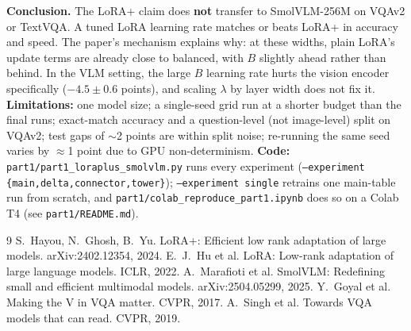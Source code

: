 \documentclass[10pt,a4paper]{article}
\begin{document}
\textbf{Conclusion.} The LoRA+ claim does \textbf{not} transfer to SmolVLM-256M on VQAv2 or TextVQA. A tuned LoRA
learning rate matches or beats LoRA+ in accuracy and speed. The paper's mechanism explains why: at these widths,
plain LoRA's update terms are already close to balanced, with $B$ slightly ahead rather than behind. In the VLM
setting, the large $B$ learning rate hurts the vision encoder specifically ($-4.5\pm0.6$ points), and scaling
$\lambda$ by layer width does not fix it. \textbf{Limitations:} one model size; a single-seed grid run at a shorter
budget than the final runs; exact-match accuracy and a question-level (not image-level) split on VQAv2; test gaps of
$\sim$2 points are within split noise; re-running the same seed varies by $\approx$1 point due to GPU
non-determinism. \textbf{Code:} \texttt{part1/part1\_loraplus\_smolvlm.py} runs every experiment
(\texttt{--experiment \{main,delta,connector,tower\}}); \texttt{--experiment single} retrains one main-table run from
scratch, and \texttt{part1/colab\_reproduce\_part1.ipynb} does so on a Colab T4 (see \texttt{part1/README.md}).

\vspace{-4pt}
{\small
\begin{thebibliography}{9}\setlength{\itemsep}{0pt}
 S.~Hayou, N.~Ghosh, B.~Yu. LoRA+: Efficient low rank adaptation of large models. arXiv:2402.12354, 2024.
 E.~J.~Hu et al. LoRA: Low-rank adaptation of large language models. ICLR, 2022.
 A.~Marafioti et al. SmolVLM: Redefining small and efficient multimodal models. arXiv:2504.05299, 2025.
 Y.~Goyal et al. Making the V in VQA matter. CVPR, 2017.
 A.~Singh et al. Towards VQA models that can read. CVPR, 2019.
\end{thebibliography}}
\end{document}
